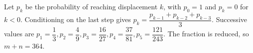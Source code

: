 Let $p_k$ be the probability of reaching displacement $k$, with $p_0=1$ and $p_k=0$ for $k<0$. Conditioning on the last step gives $p_k=\dfrac{p_{k-1}+p_{k-2}+p_{k-3}}{3}$. Successive values are $p_1=\dfrac{1}{3},p_2=\dfrac{4}{9},p_3=\dfrac{16}{27},p_4=\dfrac{37}{81},p_5=\dfrac{121}{243}$. The fraction is reduced, so $m+n=\boxed{364}$.
